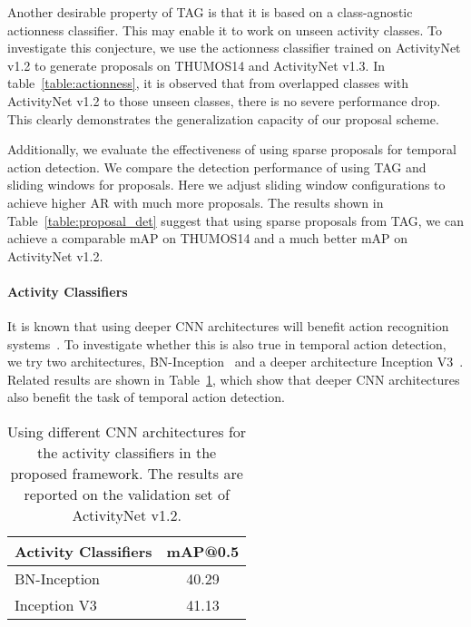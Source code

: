 \documentclass[10pt,twocolumn,letterpaper]{article}
\begin{document}
Another desirable property of TAG is that it is based on a class-agnostic actionness classifier. This may enable it to work on unseen activity classes. 
To investigate this conjecture, we use the actionness classifier trained on ActivityNet v1.2 to generate proposals on THUMOS14 and ActivityNet v1.3.
In table~\ref{table:actionness}, it is observed that from overlapped classes with ActivityNet v1.2 to those unseen classes, there is no severe performance drop.
This clearly demonstrates the generalization capacity of our proposal scheme.



Additionally, we evaluate the effectiveness of using sparse proposals for temporal action detection.
We compare the detection performance of using TAG and sliding windows for proposals.
Here we adjust sliding window configurations to achieve higher AR with much more proposals.
The results shown in Table~\ref{table:proposal_det} suggest that using sparse proposals from TAG, we can achieve a comparable mAP on THUMOS14 and a much better mAP on ActivityNet v1.2. 


\paragraph{Activity Classifiers}
It is known that using deeper CNN architectures will benefit action recognition systems~\cite{Wang2016TSN}.
To investigate whether this is also true in temporal action detection, 
we try two architectures, BN-Inception~\cite{IoffeS15BN} and a deeper architecture Inception V3~\cite{Szegedy2016InceptionV3}.
Related results are shown in Table~\ref{table:classifier},
which show that deeper CNN architectures also benefit the task of temporal action detection.

\begin{table}[t]
	\begin{center}
		\begin{tabular}[\linewidth]{l|c}
			\hline
			Activity Classifiers       & mAP@0.5 \\ \hline
			BN-Inception~\cite{IoffeS15BN}                           &    40.29   \\ \hline
			Inception V3~\cite{Szegedy2016InceptionV3}     &    41.13   \\ \hline
		\end{tabular}
	\end{center}
	\caption{Using different CNN architectures for the activity classifiers in the proposed framework. The results are reported on the validation set of ActivityNet v1.2.}
	\label{table:classifier}
\end{table}
\end{document}
